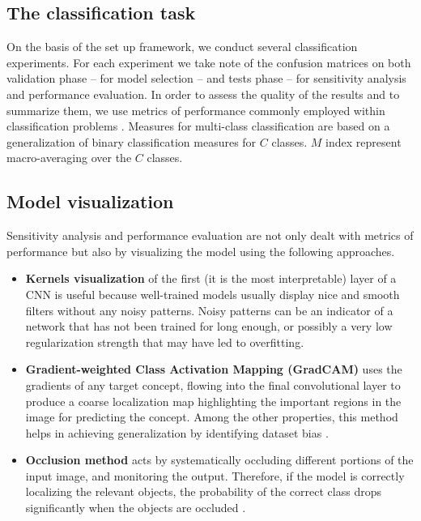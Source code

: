 \subsection{The classification task}
On the basis of the set up framework, we conduct several classification experiments. For each experiment we take note of the confusion matrices on both validation phase -- for model selection -- and tests phase -- for sensitivity analysis and performance evaluation. In order to assess the quality of the results and to summarize them, we use metrics of performance commonly employed within classification problems \cite{ref34}. Measures for multi-class classification are based on a generalization of binary classification measures for $C$ classes. $M$ index represent macro-averaging over the $C$ classes.
\subsection{Model visualization}
Sensitivity analysis and performance evaluation are not only dealt with metrics of performance but also by visualizing the model using the following approaches.
\begin{itemize}
	\item \textbf{Kernels visualization} of the first (it is the most interpretable) layer of a CNN is useful because well-trained models usually display nice and smooth filters without any noisy patterns. Noisy patterns can be an indicator of a network that has not been trained for long enough, or possibly a very low regularization strength that may have led to overfitting.
	\vspace{-10pt}
	\item \textbf{Gradient-weighted Class Activation Mapping (GradCAM)} uses the gradients of any target concept, flowing into the final convolutional layer to produce a coarse localization map highlighting the important regions in the image for predicting the concept. Among the other properties, this method helps in achieving generalization by identifying dataset bias \cite{ref12}.
	\vspace{-10pt}
	\item \textbf{Occlusion method} acts by systematically occluding different portions of the input image, and monitoring the output. Therefore, if the model is correctly localizing the relevant objects, the probability of the correct class drops significantly when the objects are occluded \cite{ref13}.
\end{itemize}